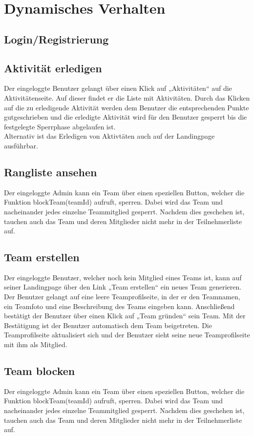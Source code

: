 ﻿\section{Dynamisches Verhalten}

\subsection{Login/Registrierung}
\subsection{Aktivität erledigen}
Der eingeloggte Benutzer gelangt über einen Klick auf „Aktivitäten“ auf die Aktivitätenseite. Auf dieser findet er die Liste mit Aktivitäten. Durch das Klicken auf die zu erledigende Aktivität werden dem Benutzer die entsprechenden Punkte gutgeschrieben und die erledigte Aktivität wird für den Benutzer gesperrt bis die festgelegte Sperrphase abgelaufen ist.\\
Alternativ ist das Erledigen von Aktivtäten auch auf der Landingpage ausführbar.\\
\subsection{Rangliste ansehen}
Der eingeloggte Admin kann ein Team über einen speziellen Button, welcher die Funktion blockTeam(teamId) aufruft, sperren. Dabei wird das Team und nacheinander jedes einzelne Teammitglied gesperrt. Nachdem dies geschehen ist, tauchen auch das Team und deren Mitglieder nicht mehr in der Teilnehmerliste auf.\\
\subsection{Team erstellen}
Der eingeloggte Benutzer, welcher noch kein Mitglied eines Teams ist, kann auf seiner Landingpage über den Link „Team erstellen“ ein neues Team generieren. Der Benutzer gelangt auf eine leere Teamprofilseite, in der er den Teamnamen, ein Teamfoto und eine Beschreibung des Teams eingeben kann. Anschließend bestätigt der Benutzer über einen Klick auf „Team gründen“ sein Team. Mit der Bestätigung ist der Benutzer automatisch dem Team beigetreten. Die Teamprofilseite aktualisiert sich und der Benutzer sieht seine neue Teamprofilseite mit ihm als Mitglied.\\
\subsection{Team blocken}
Der eingeloggte Admin kann ein Team über einen speziellen Button, welcher die Funktion blockTeam(teamId) aufruft, sperren. Dabei wird das Team und nacheinander jedes einzelne Teammitglied gesperrt. Nachdem dies geschehen ist, tauchen auch das Team und deren Mitglieder nicht mehr in der Teilnehmerliste auf.\\


